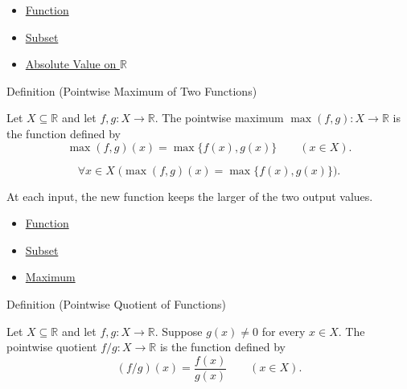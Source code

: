 \begin{dependencies}
\begin{itemize}
  \item \hyperref[def:function]{Function}
  \item \hyperref[def:subset]{Subset}
  \item \hyperref[def:real-chapter-absolute-value-on-r]{Absolute Value on $\mathbb{R}$}
\end{itemize}
\end{dependencies}

\begin{definitionbox}{Definition (Pointwise Maximum of Two Functions)}
\begin{definition}
\label{def:pointwise-maximum-of-two-functions}
Let $X\subseteq\mathbb{R}$ and let $f,g:X\to\mathbb{R}$.  The
pointwise maximum $\max(f,g):X\to\mathbb{R}$ is the function defined by
\[
  \max(f,g)(x)=\max\{f(x),g(x)\}
  \qquad (x\in X).
\]
\end{definition}
\end{definitionbox}

\begin{remark*}
\[
  \forall x\in X\;\bigl(\max(f,g)(x)=\max\{f(x),g(x)\}\bigr).
\]
\end{remark*}

\begin{remark*}[Interpretation]
At each input, the new function keeps the larger of the two output values.
\end{remark*}

\begin{dependencies}
\begin{itemize}
  \item \hyperref[def:function]{Function}
  \item \hyperref[def:subset]{Subset}
  \item \hyperref[def:maximum]{Maximum}
\end{itemize}
\end{dependencies}

\begin{definitionbox}{Definition (Pointwise Quotient of Functions)}
\begin{definition}
\label{def:pointwise-quotient-of-functions}
Let $X\subseteq\mathbb{R}$ and let $f,g:X\to\mathbb{R}$.  Suppose
$g(x)\neq 0$ for every $x\in X$.  The pointwise quotient $f/g:X\to\mathbb{R}$
is the function defined by
\[
  (f/g)(x)=\frac{f(x)}{g(x)}
  \qquad (x\in X).
\]
\end{definition}
\end{definitionbox}

